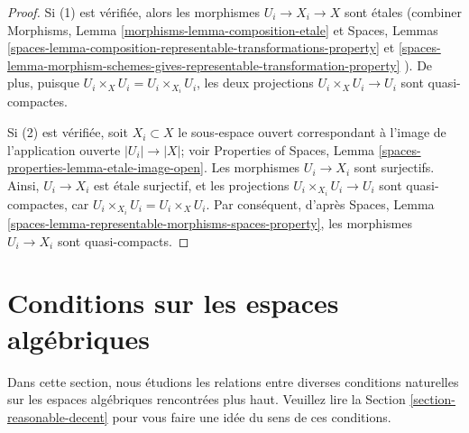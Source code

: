 \begin{proof}
Si (1) est vérifiée, alors les morphismes $U_i \to X_i \to X$ sont étales
(combiner Morphisms, Lemma \ref{morphisms-lemma-composition-etale}
et
Spaces, Lemmas
\ref{spaces-lemma-composition-representable-transformations-property} et
\ref{spaces-lemma-morphism-schemes-gives-representable-transformation-property}
).
De plus, puisque $U_i \times_X U_i = U_i \times_{X_i} U_i$,
les deux projections $U_i \times_X U_i \to U_i$ sont quasi-compactes.

\medskip\noindent
Si (2) est vérifiée, soit $X_i \subset X$ le sous-espace ouvert correspondant
à l'image de l'application ouverte $|U_i| \to |X|$; voir
Properties of Spaces,
Lemma \ref{spaces-properties-lemma-etale-image-open}.
Les morphismes $U_i \to X_i$ sont surjectifs.
Ainsi, $U_i \to X_i$ est étale surjectif, et les projections
$U_i \times_{X_i} U_i \to U_i$ sont quasi-compactes, car
$U_i \times_{X_i} U_i = U_i \times_X U_i$. Par conséquent, d'après
Spaces, Lemma \ref{spaces-lemma-representable-morphisms-spaces-property},
les morphismes $U_i \to X_i$ sont quasi-compacts.
\end{proof}








\section{Conditions sur les espaces algébriques}
\label{section-conditions}

\noindent
Dans cette section, nous étudions les relations entre diverses conditions
naturelles sur les espaces algébriques rencontrées plus haut. Veuillez lire
la Section \ref{section-reasonable-decent}
pour vous faire une idée du sens de ces conditions.

